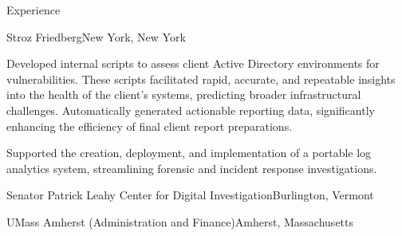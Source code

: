 \documentclass[]{mcdowellcv}
\begin{document}
\begin{cvsection}{Experience}
\begin{jobentry}{Stroz Friedberg}{New York, New York}
        \begin{jobprojects}
            \item Developed internal scripts to assess client Active Directory environments for vulnerabilities. These scripts facilitated rapid, accurate, and repeatable insights into the health of the client's systems, predicting broader infrastructural challenges. Automatically generated actionable reporting data, significantly enhancing the efficiency of final client report preparations.
            \item Supported the creation, deployment, and implementation of a portable log analytics system, streamlining forensic and incident response investigations.
        \end{jobprojects}
    \end{jobentry}

    \begin{jobentry}{Senator Patrick Leahy Center for Digital Investigation}{Burlington, Vermont}
        \begin{jobpositions}
        \end{jobpositions}
        
    \end{jobentry}

    \begin{jobentry}{UMass Amherst (Administration and Finance)}{Amherst, Massachusetts}
        \begin{jobpositions}
        \end{jobpositions}
        

    \end{jobentry}

\end{cvsection}
\end{document}
